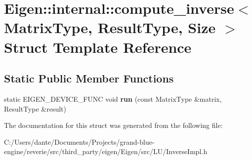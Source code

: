 \hypertarget{struct_eigen_1_1internal_1_1compute__inverse}{}\section{Eigen\+::internal\+::compute\+\_\+inverse$<$ Matrix\+Type, Result\+Type, Size $>$ Struct Template Reference}
\label{struct_eigen_1_1internal_1_1compute__inverse}
\subsection*{Static Public Member Functions}
\begin{DoxyCompactItemize}
\item 
\mbox{\label{struct_eigen_1_1internal_1_1compute__inverse_ab3392d7cab242bdb510741c662dc01dd}} 
static E\+I\+G\+E\+N\+\_\+\+D\+E\+V\+I\+C\+E\+\_\+\+F\+U\+NC void {\bfseries run} (const Matrix\+Type \&matrix, Result\+Type \&result)
\end{DoxyCompactItemize}


The documentation for this struct was generated from the following file\+:\begin{DoxyCompactItemize}
\item 
C\+:/\+Users/dante/\+Documents/\+Projects/grand-\/blue-\/engine/reverie/src/third\+\_\+party/eigen/\+Eigen/src/\+L\+U/Inverse\+Impl.\+h\end{DoxyCompactItemize}
